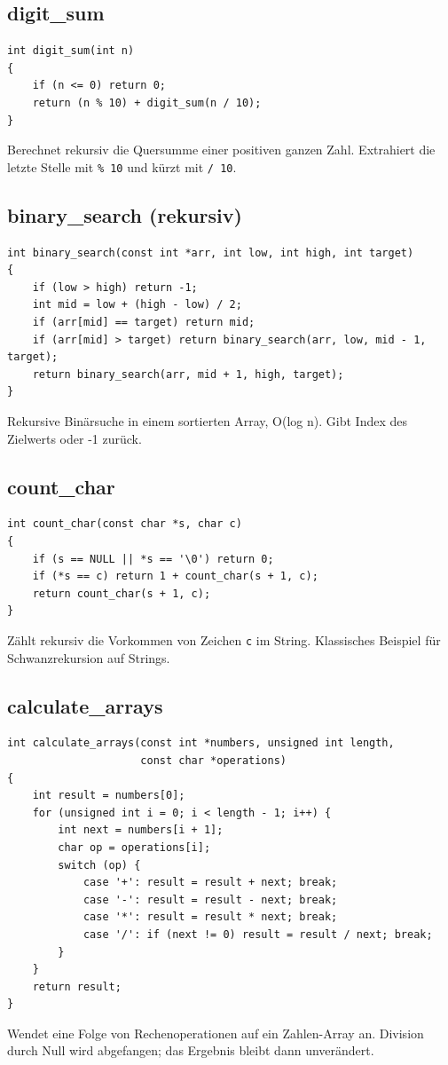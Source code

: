 \documentclass[10pt, a4paper]{article}
\begin{document}
\subsection{digit\_sum}
\begin{lstlisting}
int digit_sum(int n)
{
    if (n <= 0) return 0;
    return (n % 10) + digit_sum(n / 10);
}
\end{lstlisting}
Berechnet rekursiv die Quersumme einer positiven ganzen Zahl. Extrahiert die letzte Stelle mit \texttt{\% 10} und k\"urzt mit \texttt{/ 10}.

\subsection{binary\_search (rekursiv)}
\begin{lstlisting}
int binary_search(const int *arr, int low, int high, int target)
{
    if (low > high) return -1;
    int mid = low + (high - low) / 2;
    if (arr[mid] == target) return mid;
    if (arr[mid] > target) return binary_search(arr, low, mid - 1, target);
    return binary_search(arr, mid + 1, high, target);
}
\end{lstlisting}
Rekursive Bin\"arsuche in einem sortierten Array, O(log n). Gibt Index des Zielwerts oder -1 zur\"uck.

\subsection{count\_char}
\begin{lstlisting}
int count_char(const char *s, char c)
{
    if (s == NULL || *s == '\0') return 0;
    if (*s == c) return 1 + count_char(s + 1, c);
    return count_char(s + 1, c);
}
\end{lstlisting}
Z\"ahlt rekursiv die Vorkommen von Zeichen \texttt{c} im String. Klassisches Beispiel f\"ur Schwanzrekursion auf Strings.

\subsection{calculate\_arrays}
\begin{lstlisting}
int calculate_arrays(const int *numbers, unsigned int length,
                     const char *operations)
{
    int result = numbers[0];
    for (unsigned int i = 0; i < length - 1; i++) {
        int next = numbers[i + 1];
        char op = operations[i];
        switch (op) {
            case '+': result = result + next; break;
            case '-': result = result - next; break;
            case '*': result = result * next; break;
            case '/': if (next != 0) result = result / next; break;
        }
    }
    return result;
}
\end{lstlisting}
Wendet eine Folge von Rechenoperationen auf ein Zahlen-Array an. Division durch Null wird abgefangen; das Ergebnis bleibt dann unver\"andert.
\end{document}
